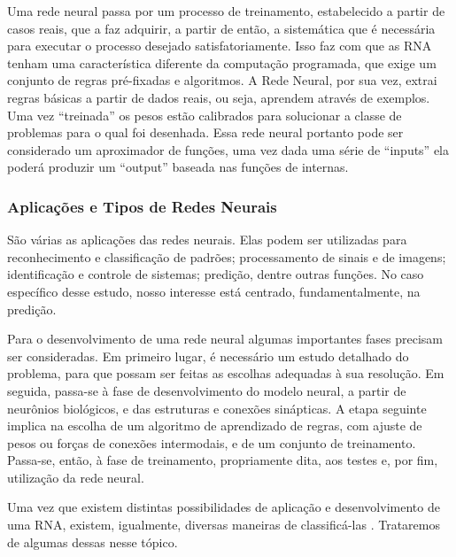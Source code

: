 Uma rede neural passa por um processo de treinamento, estabelecido a partir de casos reais, que a faz adquirir, a partir de então, a sistemática que é necessária para executar o processo desejado satisfatoriamente. Isso faz com que as RNA tenham uma característica diferente da computação programada, que exige um conjunto de regras pré-fixadas e algoritmos. 
A Rede Neural, por sua vez, extrai regras básicas a partir de dados reais, ou seja, aprendem através de exemplos.
Uma vez ``treinada'' os pesos estão calibrados para solucionar a classe de problemas para o qual foi desenhada. Essa rede neural portanto pode ser 
considerado um aproximador de funções, uma vez dada uma série de ``inputs'' ela poderá produzir um ``output'' baseada nas funções de internas.

\subsubsection{Aplicações e Tipos de Redes Neurais}

São várias as aplicações das redes neurais. Elas podem ser utilizadas para reconhecimento e classificação de padrões;
processamento de sinais e de imagens; identificação e controle de sistemas; predição, dentre outras funções. 
No caso específico desse estudo, nosso interesse está centrado, fundamentalmente, na predição.

Para o desenvolvimento de uma rede neural algumas importantes fases precisam ser consideradas. 
Em primeiro lugar, é necessário um estudo detalhado do problema, para que possam ser feitas as escolhas adequadas à sua resolução. 
Em seguida, passa-se à fase de desenvolvimento do modelo neural, a partir de neurônios biológicos, e das estruturas e conexões sinápticas. 
A etapa seguinte implica na escolha de um algoritmo de aprendizado de regras, com ajuste de pesos ou forças de conexões intermodais, e de um conjunto de treinamento. 
Passa-se, então, à fase de treinamento, propriamente dita, aos testes e, por fim, utilização da rede neural.

Uma vez que existem distintas possibilidades de aplicação e desenvolvimento de uma RNA, existem, igualmente, diversas maneiras de 
classificá-las \cite{AAP}. Trataremos de algumas dessas nesse tópico.

